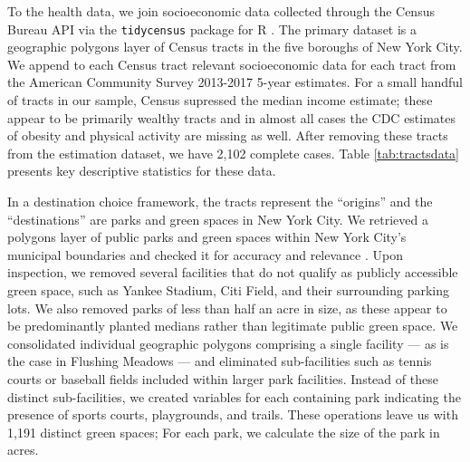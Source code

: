 \documentclass[Crown,sageh.bst]{sagej}
\begin{document}
To the health data, we join socioeconomic data collected through the
Census Bureau API via the \texttt{tidycensus} package for R
\citep{Walker2019}. The primary dataset is a geographic polygons layer
of Census tracts in the five boroughs of New York City. We append to
each Census tract relevant socioeconomic data for each tract from the
American Community Survey 2013-2017 5-year estimates. For a small
handful of tracts in our sample, Census supressed the median income
estimate; these appear to be primarily wealthy tracts and in almost all
cases the CDC estimates of obesity and physical activity are missing as
well. After removing these tracts from the estimation dataset, we have
2,102 complete cases. Table \ref{tab:tractsdata} presents key
descriptive statistics for these data.

In a destination choice framework, the tracts represent the ``origins''
and the ``destinations'' are parks and green spaces in New York City. We
retrieved a polygons layer of public parks and green spaces within New
York City's municipal boundaries and checked it for accuracy and
relevance \citep{nycparks}. Upon inspection, we removed several
facilities that do not qualify as publicly accessible green space, such
as Yankee Stadium, Citi Field, and their surrounding parking lots. We
also removed parks of less than half an acre in size, as these appear to
be predominantly planted medians rather than legitimate public green
space. We consolidated individual geographic polygons comprising a
single facility --- as is the case in Flushing Meadows --- and
eliminated sub-facilities such as tennis courts or baseball fields
included within larger park facilities. Instead of these distinct
sub-facilities, we created variables for each containing park indicating
the presence of sports courts, playgrounds, and trails. These operations
leave us with 1,191 distinct green spaces; For each park, we calculate
the size of the park in acres.
\end{document}
